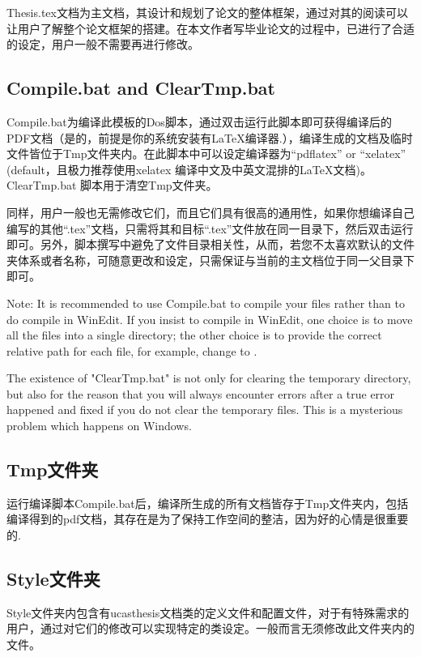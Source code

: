 Thesis.tex文档为主文档，其设计和规划了论文的整体框架，通过对其的阅读可以让用户了解整个论文框架的搭建。在本文作者写毕业论文的过程中，已进行了合适的设定，用户一般不需要再进行修改。

\subsection{Compile.bat and Clear\textunderscore Tmp.bat}

Compile.bat为编译此模板的Dos脚本，通过双击运行此脚本即可获得编译后的PDF文档（是的，前提是你的系统安装有\LaTeX{}编译器.），编译生成的文档及临时文件皆位于Tmp文件夹内。在此脚本中可以设定编译器为“pdflatex” or “xelatex” (default，且极力推荐使用xelatex 编译中文及中英文混排的\LaTeX{}文档)。Clear\textunderscore Tmp.bat 脚本用于清空Tmp文件夹。

同样，用户一般也无需修改它们，而且它们具有很高的通用性，如果你想编译自己编写的其他“.tex”文档，只需将其和目标“.tex”文件放在同一目录下，然后双击运行即可。另外，脚本撰写中避免了文件目录相关性，从而，若您不太喜欢默认的文件夹体系或者名称，可随意更改和设定，只需保证与当前的主文档位于同一父目录下即可。

Note: It is recommended to use Compile.bat to compile your files rather than to do compile in WinEdit. If you insist to compile in WinEdit, one choice is to move all the files into a single directory; the other choice is to provide the correct relative path for each file, for example, change \verb++ to \verb++. 

The existence of "Clear\textunderscore Tmp.bat" is not only for clearing the temporary directory, but also for the reason that you will always encounter errors after a true error happened and fixed if you do not clear the temporary files. This is a mysterious problem which happens on Windows. 

\subsection{Tmp文件夹}

运行编译脚本Compile.bat后，编译所生成的所有文档皆存于Tmp文件夹内，包括编译得到的pdf文档，其存在是为了保持工作空间的整洁，因为好的心情是很重要的.

\subsection{Style文件夹}

Style文件夹内包含有ucasthesis文档类的定义文件和配置文件，对于有特殊需求的用户，通过对它们的修改可以实现特定的类设定。一般而言无须修改此文件夹内的文件。

